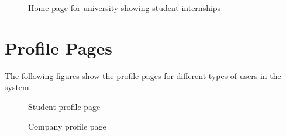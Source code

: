 \begin{figure}[H]
    \centering
    \caption*{Home page for university showing student internships}
\end{figure}

\section{Profile Pages}
The following figures show the profile pages for different types of users in the system.

\begin{figure}[H]
    \centering
    \caption*{Student profile page}
\end{figure}

\begin{figure}[H]
    \centering
    \caption*{Company profile page}
\end{figure}

